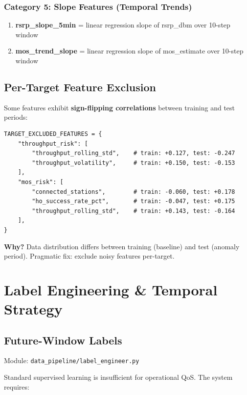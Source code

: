 \documentclass[11pt,a4paper,oneside]{report}
\begin{document}
\subsection{Category 5: Slope Features (Temporal Trends)}

\begin{enumerate}
    \item \textbf{rsrp\_slope\_5min} = linear regression slope of rsrp\_dbm over 10-step window
    \item \textbf{mos\_trend\_slope} = linear regression slope of mos\_estimate over 10-step window
\end{enumerate}

\section{Per-Target Feature Exclusion}

Some features exhibit \textbf{sign-flipping correlations} between training and test periods:

\begin{lstlisting}
TARGET_EXCLUDED_FEATURES = {
    "throughput_risk": [
        "throughput_rolling_std",    # train: +0.127, test: -0.247
        "throughput_volatility",     # train: +0.150, test: -0.153
    ],
    "mos_risk": [
        "connected_stations",        # train: -0.060, test: +0.178
        "ho_success_rate_pct",       # train: -0.047, test: +0.175
        "throughput_rolling_std",    # train: +0.143, test: -0.164
    ],
}
\end{lstlisting}

\textbf{Why?} Data distribution differs between training (baseline) and test (anomaly period). Pragmatic fix: exclude noisy features per-target.

\newpage

\chapter{Label Engineering \& Temporal Strategy}

\section{Future-Window Labels}

Module: \texttt{data\_pipeline/label\_engineer.py}

Standard supervised learning is insufficient for operational QoS. The system requires:
\end{document}
